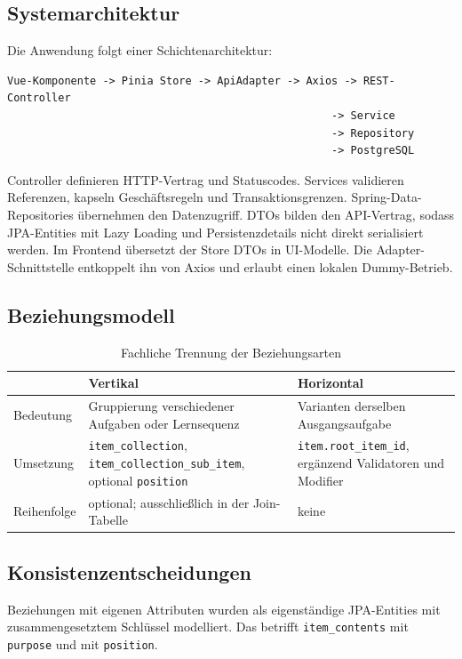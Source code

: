 ﻿\documentclass[11pt,a4paper]{article}
\begin{document}
\subsection{Systemarchitektur}
Die Anwendung folgt einer Schichtenarchitektur:
\begin{verbatim}
Vue-Komponente -> Pinia Store -> ApiAdapter -> Axios -> REST-Controller
                                                   -> Service
                                                   -> Repository
                                                   -> PostgreSQL
\end{verbatim}
Controller definieren HTTP-Vertrag und Statuscodes. Services validieren
Referenzen, kapseln Geschäftsregeln und Transaktionsgrenzen. Spring-Data-
Repositories übernehmen den Datenzugriff. DTOs bilden den API-Vertrag, sodass
JPA-Entities mit Lazy Loading und Persistenzdetails nicht direkt serialisiert
werden. Im Frontend übersetzt der Store DTOs in UI-Modelle. Die Adapter-
Schnittstelle entkoppelt ihn von Axios und erlaubt einen lokalen Dummy-Betrieb.

\subsection{Beziehungsmodell}
\begin{table}[H]\centering
\begin{tabularx}{\linewidth}{@{}l Y Y@{}}\toprule
&\textbf{Vertikal}&\textbf{Horizontal}\\\midrule
Bedeutung&Gruppierung verschiedener Aufgaben oder Lernsequenz&
Varianten derselben Ausgangsaufgabe\\
\hline

Umsetzung&\texttt{item\_collection},
\texttt{item\_collection\_sub\_item}, optional \texttt{position}&
\texttt{item.root\_item\_id}, ergänzend Validatoren und Modifier\\
\hline

Reihenfolge&optional; ausschließlich in der Join-Tabelle&keine\\

\bottomrule
\end{tabularx}
\caption{Fachliche Trennung der Beziehungsarten}
\end{table}

\subsection{Konsistenzentscheidungen}
Beziehungen mit eigenen Attributen wurden als eigenständige JPA-Entities mit
zusammengesetztem Schlüssel modelliert. Das betrifft
\texttt{item\_contents} mit \texttt{purpose} und
 mit \texttt{position}.
\end{document}
